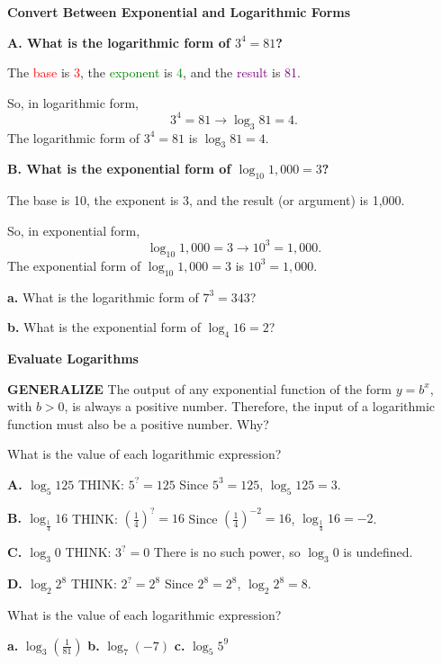 \documentclass{article}
\newenvironment{example}[1]{}{}
\newenvironment{tryit}[1]{}{}
\begin{document}
\begin{example}{2}
\textbf{Convert Between Exponential and Logarithmic Forms}

\textbf{A. What is the logarithmic form of $3^4 = 81$?}

The \textcolor{red}{base} is \textcolor{red}{3}, the \textcolor{green}{exponent} is \textcolor{green}{4}, and the \textcolor{purple}{result} is \textcolor{purple}{81}.

So, in logarithmic form,
$$3^4 = 81 \rightarrow \log_3 81 = 4.$$
The logarithmic form of $3^4 = 81$ is $\log_3 81 = 4$.

\textbf{B. What is the exponential form of $\log_{10} 1,000 = 3$?}

The base is 10, the exponent is 3, and the result (or argument) is 1,000.

So, in exponential form,
$$\log_{10} 1,000 = 3 \rightarrow 10^3 = 1,000.$$
The exponential form of $\log_{10} 1,000 = 3$ is $10^3 = 1,000$.
\end{example}

\begin{tryit}{2}
\textbf{a.} What is the logarithmic form of $7^3 = 343$?

\textbf{b.} What is the exponential form of $\log_4 16 = 2$?
\end{tryit}

\begin{example}{3}
\textbf{Evaluate Logarithms}

\textbf{GENERALIZE}
The output of any exponential function of the form $y = b^x$, with $b > 0$, is always a positive number. Therefore, the input of a logarithmic function must also be a positive number. Why?

What is the value of each logarithmic expression?

\textbf{A. $\log_5 125$}
THINK: $5^? = 125$
Since $5^3 = 125$, $\log_5 125 = 3$.

\textbf{B. $\log_{\frac{1}{4}} 16$}
THINK: $\left(\frac{1}{4}\right)^? = 16$
Since $\left(\frac{1}{4}\right)^{-2} = 16$, $\log_{\frac{1}{4}} 16 = -2$.

\textbf{C. $\log_3 0$}
THINK: $3^? = 0$
There is no such power, so $\log_3 0$ is undefined.

\textbf{D. $\log_2 2^8$}
THINK: $2^? = 2^8$
Since $2^8 = 2^8$, $\log_2 2^8 = 8$.
\end{example}

\begin{tryit}{3}
What is the value of each logarithmic expression?

\textbf{a.} $\log_3\left(\frac{1}{81}\right)$ \qquad \textbf{b.} $\log_7(-7)$ \qquad \textbf{c.} $\log_5 5^9$
\end{tryit}
\end{document}

